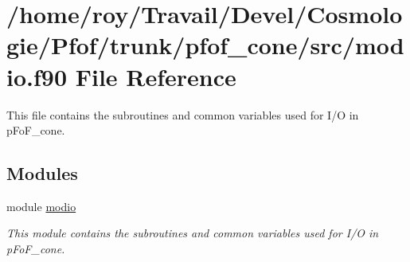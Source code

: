 \hypertarget{modio_8f90}{}\section{/home/roy/\+Travail/\+Devel/\+Cosmologie/\+Pfof/trunk/pfof\+\_\+cone/src/modio.f90 File Reference}
\label{modio_8f90}


This file contains the subroutines and common variables used for I/O in p\+Fo\+F\+\_\+cone.  


\subsection*{Modules}
\begin{DoxyCompactItemize}
\item 
module \hyperlink{namespacemodio}{modio}
\begin{DoxyCompactList}\small\item\em This module contains the subroutines and common variables used for I/O in p\+Fo\+F\+\_\+cone. \end{DoxyCompactList}\end{DoxyCompactItemize}
